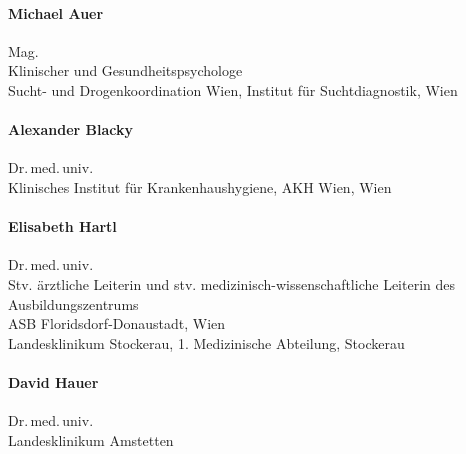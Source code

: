 \begin{raggedright}
\begin{minipage}{\linewidth}
    \paragraph{Michael Auer}
    Mag.\\[.25\baselineskip]
    Klinischer und Gesundheitspsychologe\\[.25\baselineskip]
    {\color{AltBlueDark}Sucht- und Drogenkoordination Wien, Institut für
    Suchtdiagnostik}, Wien
  \end{minipage}

  \bigskip

  \begin{minipage}{\linewidth}\raggedright
    \paragraph{Alexander Blacky}
    Dr.\,med.\,univ.\\[.25\baselineskip]
    {\color{AltBlueDark}Klinisches Institut für Krankenhaushygiene, AKH
    Wien}, Wien
  \end{minipage}

  \bigskip

  \begin{minipage}{\linewidth}\raggedright
    \paragraph{Elisabeth Hartl}
    Dr.\,med.\,univ.\\[.25\baselineskip]
    Stv. ärztliche Leiterin und stv. medizinisch-wissenschaftliche Leiterin des Ausbildungszentrums\\
    {\color{AltBlueDark}ASB Florids\-dorf-Donau\-stadt},
    Wien\\
    {\color{AltBlueDark}Landesklinikum Stockerau, 1. Medizinische 
    Abteilung}, Stockerau
  \end{minipage}

  \bigskip

  \begin{minipage}{\linewidth}\raggedright
    \paragraph{David Hauer}
    Dr.\,med.\,univ.\\[.25\baselineskip]
    {\color{AltBlueDark}Landesklinikum Amstetten}
  \end{minipage}

  \bigskip


\end{raggedright}
